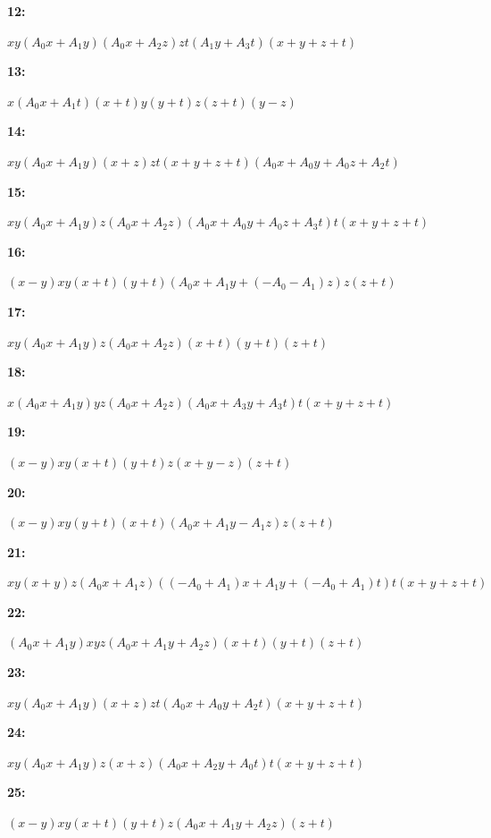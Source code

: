\documentclass[12pt]{amsart}
\theoremstyle{plain}
\theoremstyle{remark}
\theoremstyle{definition}
\numberwithin{table}{section}
\begin{document}
\noindent\parbox[right]{9mm}{\textbf{12:}}\parbox{3mm}{\hfill}%
\parbox[t]{15cm}{\(xy(A_{0}x + A_{1}y)(A_{0}x + A_{2}z)zt(A_{1}y + A_{3}t)(x + y + z + t)\)}

\noindent\parbox[right]{9mm}{\textbf{13:}}\parbox{3mm}{\hfill}%
\parbox[t]{15cm}{\(x(A_{0}x + A_{1}t)(x + t)y(y + t)z(z + t)(y - z)\)}

\noindent\parbox[right]{9mm}{\textbf{14:}}\parbox{3mm}{\hfill}%
\parbox[t]{15cm}{\(xy(A_{0}x + A_{1}y)(x + z)zt(x + y + z + t)(A_{0}x + A_{0}y + A_{0}z + A_{2}t)\)}

\noindent\parbox[right]{9mm}{\textbf{15:}}\parbox{3mm}{\hfill}%
\parbox[t]{15cm}{\(xy(A_{0}x + A_{1}y)z(A_{0}x + A_{2}z)(A_{0}x + A_{0}y + A_{0}z + A_{3}t)t(x + y + z + t)\)}

\noindent\parbox[right]{9mm}{\textbf{16:}}\parbox{3mm}{\hfill}%
\parbox[t]{15cm}{\((x - y)xy(x + t)(y + t)(A_{0}x + A_{1}y + (-A_{0} - A_{1})z)z(z + t)\)}

\noindent\parbox[right]{9mm}{\textbf{17:}}\parbox{3mm}{\hfill}%
\parbox[t]{15cm}{\(xy(A_{0}x + A_{1}y)z(A_{0}x + A_{2}z)(x + t)(y + t)(z + t)\)}

\noindent\parbox[right]{9mm}{\textbf{18:}}\parbox{3mm}{\hfill}%
\parbox[t]{15cm}{\(x(A_{0}x + A_{1}y)yz(A_{0}x + A_{2}z)(A_{0}x + A_{3}y + A_{3}t)t(x + y + z + t)\)}

\noindent\parbox[right]{9mm}{\textbf{19:}}\parbox{3mm}{\hfill}%
\parbox[t]{15cm}{\((x - y)xy(x + t)(y + t)z(x + y - z)(z + t)\)}

\noindent\parbox[right]{9mm}{\textbf{20:}}\parbox{3mm}{\hfill}%
\parbox[t]{15cm}{\((x - y)xy(y + t)(x + t)(A_{0}x + A_{1}y - A_{1}z)z(z + t)\)}

\noindent\parbox[right]{9mm}{\textbf{21:}}\parbox{3mm}{\hfill}%
\parbox[t]{15cm}{\(xy(x + y)z(A_{0}x + A_{1}z)((-A_{0} + A_{1})x + A_{1}y + (-A_{0} + A_{1})t)t(x + y + z + t)\)}

\noindent\parbox[right]{9mm}{\textbf{22:}}\parbox{3mm}{\hfill}%
\parbox[t]{15cm}{\((A_{0}x + A_{1}y)xyz(A_{0}x + A_{1}y + A_{2}z)(x + t)(y + t)(z + t)\)}

\noindent\parbox[right]{9mm}{\textbf{23:}}\parbox{3mm}{\hfill}%
\parbox[t]{15cm}{\(xy(A_{0}x + A_{1}y)(x + z)zt(A_{0}x + A_{0}y + A_{2}t)(x + y + z + t)\)}

\noindent\parbox[right]{9mm}{\textbf{24:}}\parbox{3mm}{\hfill}%
\parbox[t]{15cm}{\(xy(A_{0}x + A_{1}y)z(x + z)(A_{0}x + A_{2}y + A_{0}t)t(x + y + z + t)\)}

\noindent\parbox[right]{9mm}{\textbf{25:}}\parbox{3mm}{\hfill}%
\parbox[t]{15cm}{\((x - y)xy(x + t)(y + t)z(A_{0}x + A_{1}y + A_{2}z)(z + t)\)}
\end{document}
